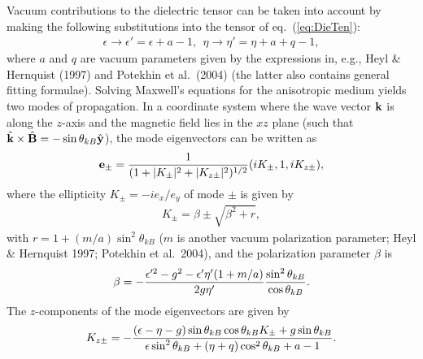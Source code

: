 \documentclass[useAMS,onecolumn,usenatbib,usegraphicx]{mn2e}
\begin{document}
Vacuum contributions to the dielectric tensor can be taken into account by making the following substitutions into 
the tensor of eq.~(\ref{eq:DieTen}):
\begin{eqnarray}
\epsilon\rightarrow\epsilon' = \epsilon + a - 1,\ \ \eta\rightarrow\eta' = \eta + a + q - 1,
\end{eqnarray}
where $a$ and $q$ are vacuum parameters given by the expressions in,
e.g., Heyl \& Hernquist (1997) and Potekhin et al.~(2004) 
(the latter also contains general fitting formulae).
Solving Maxwell's 
equations for the anisotropic medium yields two modes of propagation.  In a coordinate system where the wave vector ${\bf k}$ is 
along the $z$-axis and the magnetic field lies in the 
$xz$ plane (such that $\hat{\bf k}\times\hat{\bf B}=-\sin\theta_{kB}\hat{\bf y}$), the mode eigenvectors can be written as
\begin{eqnarray}
\label{eq:ModeEigenvs}
{\bf e}_{\pm} = {1\over (1+|K_{\pm}|^2+|K_{z\pm}|^2)^{1/2}}(iK_{\pm},1,iK_{z\pm}),
\end{eqnarray}
where the ellipticity $K_{\pm} = -i e_x/e_y$ of mode $\pm$ is given by
\begin{eqnarray}
\label{eq:Ellipticity}
K_{\pm} = \beta\pm\sqrt{\beta^2+r},
\end{eqnarray}
with $r=1+(m/a)\sin^2\theta_{kB}$ ($m$ is another vacuum polarization
parameter; Heyl \& Hernquist 1997; Potekhin et al.~2004),
and the polarization parameter $\beta$ is
\begin{eqnarray}
\beta = -{\epsilon'^2-g^2-\epsilon'\eta'(1+m/a) \over 2 g\eta'}{\sin^2\theta_{kB}\over\cos\theta_{kB}}.
\end{eqnarray}
The $z$-components of the mode eigenvectors are given by
\begin{eqnarray}
K_{z\pm}=-{(\epsilon-\eta-g)\sin\theta_{kB}\cos\theta_{kB} K_{\rm\pm}+g\sin\theta_{kB}\over 
\epsilon\sin^2\theta_{kB}+(\eta+q)\cos^2\theta_{kB}+a-1}.
\end{eqnarray}
\end{document}
